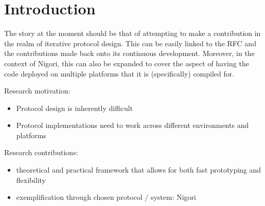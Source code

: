 \chapter{Introduction}
\setcounter{page}{1}

The story at the moment should be that of attempting to make a contribution in the realm of iterative protocol design.
This can be easily linked to the RFC and the contributions made back onto its continuous development.
Moreover, in the context of Nigori, this can also be expanded to cover the aspect of having the code deployed on multiple platforms that it is (specifically) compiled for.

Research motivation:
\begin{itemize}
  \item Protocol design is inherently difficult
  \item Protocol implementations need to work across different environments and platforms
\end{itemize}
Research contributions:
\begin{itemize}
  \item theoretical and practical framework that allows for both fast prototyping and flexibility
  \item exemplification through chosen protocol / system: Nigori
\end{itemize}
